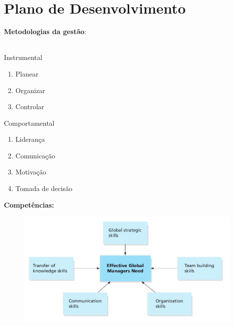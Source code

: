 \section{Plano de Desenvolvimento}
\begin{frame}
\begin{minipage}{16cm}
	\textbf{Metodologias da gestão}:\\
	\\
	\begin{minipage}{8cm}
		Instrumental
		\begin{enumerate}
			\setlength\itemsep{1.5em}
			\item Planear
			\item Organizar
			\item Controlar \\
		\end{enumerate}
	\end{minipage}
	\begin{minipage}{5cm}
		Comportamental
		\begin{enumerate}
			\setlength\itemsep{.5em}
			\item Liderança
			\item Comunicação
			\item Motivação
			\item Tomada de decisão
		\end{enumerate}
	\end{minipage}
\end{minipage}
\end{frame}
\begin{frame}
\textbf{\Large Competências:}\\
\begin{minipage}{15cm}
	\begin{figure}[ht]
		\centering
		\includegraphics[scale=0.3]{"./image/Skills/Managerial Skills for the Global Marketplace.jpg"}
	\end{figure}
\end{minipage}
\end{frame}
